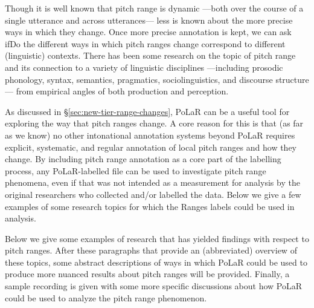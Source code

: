 \documentclass[11pt, twoside]{memoir}
\begin{document}
Though it is well known that pitch range is dynamic —both over the course of a single utterance and across utterances— less is known about the more precise ways in which they change. Once more precise annotation is kept, we can ask ifDo the different ways in which pitch ranges change correspond to different (linguistic) contexts. There has been some research on the topic of pitch range and its connection to a variety of linguistic disciplines —including prosodic phonology, syntax, semantics, pragmatics, sociolinguistics, and discourse structure— from empirical angles of both production and perception.

As discussed in §\ref{sec:new-tier-range-changes}, PoLaR can be a useful tool for exploring the way that pitch ranges change. A core reason for this is that (as far as we know) no other intonational annotation systems beyond PoLaR requires explicit, systematic, and regular annotation of local pitch ranges and how they change. By including pitch range annotation as a core part of the labelling process, any PoLaR-labelled file can be used to investigate pitch range phenomena, even if that was not intended as a measurement for analysis by the original researchers who collected and/or labelled the data. Below we give a few examples of some research topics for which the Ranges labels could be used in analysis.

Below we give some examples of research that has yielded findings with respect to pitch ranges. After these paragraphs that provide an (abbreviated) overview of these topics, some abstract descriptions of ways in which PoLaR could be used to produce more nuanced results about pitch ranges will be provided. Finally, a sample recording is given with some more specific discussions about how PoLaR could be used to analyze the pitch range phenomenon.
\end{document}
